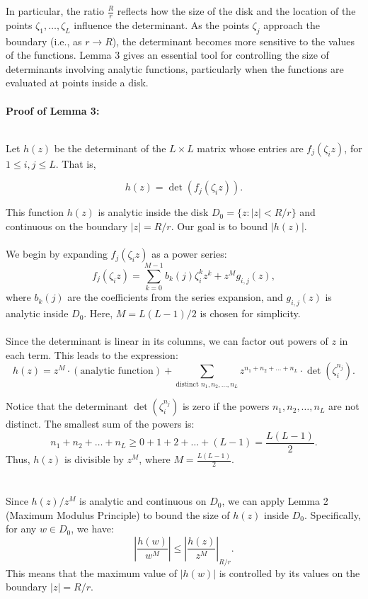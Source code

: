 \documentclass{article}
\newenvironment{proofbox}
  {\begin{mdframed}[linewidth=1pt,linecolor=black,backgroundcolor=white]\noindent\ignorespaces}
  {\end{mdframed}}
\begin{document}
In particular, the ratio \( \frac{R}{r} \) reflects how the size of the disk and the location of the points \( \zeta_1, \dots, \zeta_L \) influence the determinant. As the points \( \zeta_j \) approach the boundary (i.e., as \( r \to R \)), the determinant becomes more sensitive to the values of the functions.
Lemma 3 gives an essential tool for controlling the size of determinants involving analytic functions, particularly when the functions are evaluated at points inside a disk. \\\\
\textbf{Proof of Lemma 3:}\\\\
\begin{proofbox}
    
Let \( h(z) \) be the determinant of the \( L \times L \) matrix whose entries are \( f_j(\zeta_i z) \), for \( 1 \leq i, j \leq L \). That is,

\[
h(z) = \det(f_j(\zeta_i z)).
\]

This function \( h(z) \) is analytic inside the disk \( D_0 = \{ z : |z| < R/r \} \) and continuous on the boundary \( |z| = R/r \). Our goal is to bound \( |h(z)| \).\\\\
We begin by expanding \( f_j(\zeta_i z) \) as a power series:
\[
f_j(\zeta_i z) = \sum_{k=0}^{M-1} b_k(j) \zeta_i^k z^k + z^M g_{i,j}(z),
\]
where \( b_k(j) \) are the coefficients from the series expansion, and \( g_{i,j}(z) \) is analytic inside \( D_0 \). Here, \( M = L(L-1)/2 \) is chosen for simplicity.\\\\
Since the determinant is linear in its columns, we can factor out powers of \( z \) in each term. This leads to the expression:
\[
h(z) = z^M \cdot \left( \text{analytic function} \right) + \sum_{\text{distinct } n_1, n_2, \dots, n_L} z^{n_1 + n_2 + \dots + n_L} \cdot \det(\zeta_i^{n_j}).
\]

Notice that the determinant \( \det(\zeta_i^{n_j}) \) is zero if the powers \( n_1, n_2, \dots, n_L \) are not distinct. The smallest sum of the powers is:
\[
n_1 + n_2 + \dots + n_L \geq 0 + 1 + 2 + \dots + (L-1) = \frac{L(L-1)}{2}.
\]
Thus, \( h(z) \) is divisible by \( z^M \), where \( M = \frac{L(L-1)}{2} \).\\\\\\
Since \( h(z) / z^M \) is analytic and continuous on \( D_0 \), we can apply Lemma 2 (Maximum Modulus Principle) to bound the size of \( h(z) \) inside \( D_0 \). Specifically, for any \( w \in D_0 \), we have:
\[
\left| \frac{h(w)}{w^M} \right| \leq \left| \frac{h(z)}{z^M} \right|_{R/r}.
\]
This means that the maximum value of \( |h(w)| \) is controlled by its values on the boundary \( |z| = R/r \).



\end{proofbox}
\end{document}
